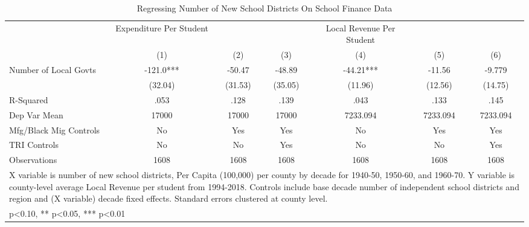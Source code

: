 \begin{table}[htbp]\centering
\def\sym#1{\ifmmode^{#1}\else\(^{#1}\)\fi}
\caption{Regressing Number of New School Districts On School Finance Data}
\begin{tabular}{l*{6}{c}}
\toprule
                    &Expenditure Per Student   &               &               &Local Revenue Per Student   &               &               \\
                    &\multicolumn{1}{c}{(1)}   &\multicolumn{1}{c}{(2)}   &\multicolumn{1}{c}{(3)}   &\multicolumn{1}{c}{(4)}   &\multicolumn{1}{c}{(5)}   &\multicolumn{1}{c}{(6)}   \\
\midrule
Number of Local Govts&      -121.0***&      -50.47   &      -48.89   &      -44.21***&      -11.56   &      -9.779   \\
                    &     (32.04)   &     (31.53)   &     (35.05)   &     (11.96)   &     (12.56)   &     (14.75)   \\
\midrule
R-Squared           &        .053   &        .128   &        .139   &        .043   &        .133   &        .145   \\
Dep Var Mean        &       17000   &       17000   &       17000   &    7233.094   &    7233.094   &    7233.094   \\
Mfg/Black Mig Controls&          No   &         Yes   &         Yes   &          No   &         Yes   &         Yes   \\
TRI Controls        &          No   &          No   &         Yes   &          No   &          No   &         Yes   \\
Observations        &        1608   &        1608   &        1608   &        1608   &        1608   &        1608   \\
\bottomrule
\multicolumn{7}{l}{\footnotesize X variable is number of new school districts, Per Capita (100,000) per county by decade for 1940-50, 1950-60, and 1960-70. Y variable is county-level average Local Revenue per student from 1994-2018. Controls include base decade number of independent school districts and region and (X variable) decade fixed effects. Standard errors clustered at county level.}\\
\multicolumn{7}{l}{\footnotesize * p<0.10, ** p<0.05, *** p<0.01}\\
\end{tabular}
\end{table}

